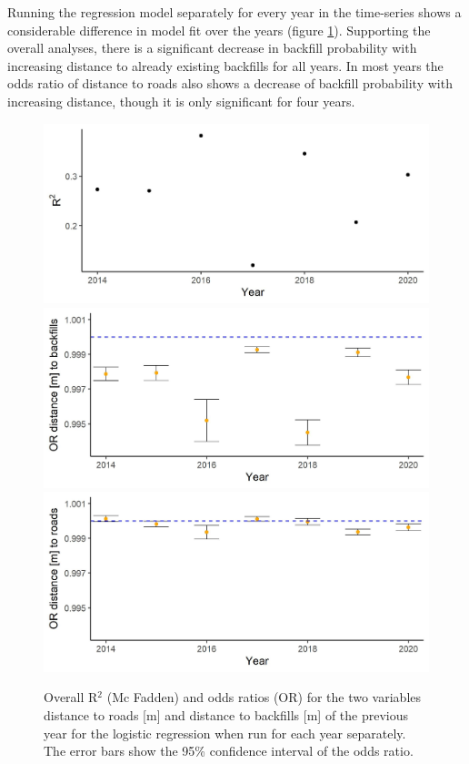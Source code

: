 \documentclass[11pt, letterpaper, oneside]{article}
\begin{document}
Running the regression model separately for every year in the time-series shows a considerable difference in model fit over the years (figure \ref{fig:logitimeseries}). Supporting the overall analyses, there is a significant decrease in backfill probability with increasing distance to already existing backfills for all years. In most years the odds ratio of distance to roads also shows a decrease of backfill probability with increasing distance, though it is only significant for four years. 

\begin{figure}[H]
\includegraphics[width = 15 cm]{figures/logreg_year_Rsq.jpeg}
\includegraphics[width = 15 cm]{figures/logreg_year_BFdist.jpeg}
\includegraphics[width = 15 cm]{figures/logreg_year_Roadist.jpeg}
\caption{Overall R$^2$ (Mc Fadden) and odds ratios (OR) for the two variables distance to roads [m] and distance to backfills [m] of the previous year for the logistic regression when run for each year separately. The error bars show the 95\% confidence interval of the odds ratio.}
\label{fig:logitimeseries}
\end{figure}
\end{document}
